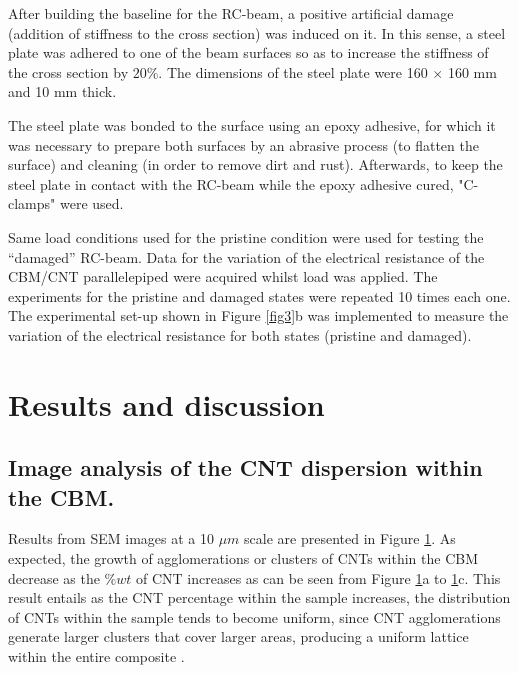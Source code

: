 \documentclass[twocolumn]{bmcart}%
\begin{document}
After building the baseline for the RC-beam, a positive artificial damage (addition of stiffness to the cross section) was induced on it. In this sense, a steel plate was adhered to one of the beam surfaces so as to increase the stiffness of the cross section by $20\%$. The dimensions of the steel plate were 160 $\times$ 160 mm and 10 mm thick. 

The steel plate was bonded to the surface using an epoxy adhesive, for which it was necessary to prepare both surfaces by an abrasive process (to flatten the surface) and cleaning (in order to remove dirt and rust). Afterwards, to keep the steel plate in contact with the RC-beam while the epoxy adhesive cured, "C-clamps" were used.

Same load conditions used for the pristine condition were used for testing the “damaged” RC-beam. Data for the variation of the electrical resistance of the CBM/CNT parallelepiped were acquired whilst load was applied. The experiments for the pristine and damaged states were repeated 10 times each one. The experimental set-up shown in Figure \ref{fig3}b was implemented to measure the variation of the electrical resistance for both states (pristine and damaged).

\section{Results and discussion}

\subsection{Image analysis of the CNT dispersion within the CBM.}

Results from SEM images at a 10 $\mu m$ scale are presented in Figure \ref{fig7}. As expected, the growth of agglomerations or clusters of CNTs within the CBM decrease as the $\%wt$ of CNT increases as can be seen from Figure \ref{fig7}a  to \ref{fig7}c. This result entails as the CNT percentage within the sample increases, the distribution of CNTs within the sample tends to become uniform, since CNT agglomerations generate larger clusters that cover larger areas, producing a uniform lattice within the entire composite \cite{Garcia-Macias2017, Nam2015}.

\begin{figure}[h!]
  \caption{
      }
      \label{fig7}
      \end{figure}
\end{document}
